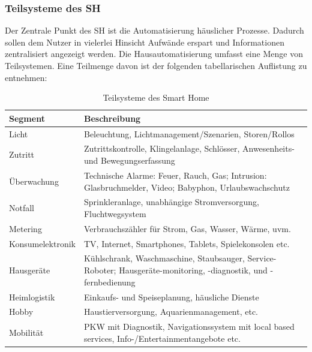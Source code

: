     \subsubsection*{Teilsysteme des \acl{SH}}
        Der Zentrale Punkt des \acl{SH} ist die Automatisierung häuslicher Prozesse. Dadurch sollen dem Nutzer 
        in vielerlei Hinsicht Aufwände erspart und Informationen zentralisiert angezeigt werden. Die Hausautomatisierung 
        umfasst eine Menge von Teilsystemen. Eine Teilmenge davon ist der folgenden tabellarischen Auflistung zu entnehmen: 
        \begin{table}[hbt!]
            \begin{center}
                \begin{tabular}{| p{3cm} | p{12.75cm} | }
                    \hline
                        \textbf{Segment} & \textbf{Beschreibung} \\
                    \hline
                        Licht & Beleuchtung, Lichtmanagement/Szenarien, Storen/Rollos \\ 
                    \hline
                        Zutritt & Zutrittskontrolle, Klingelanlage, Schlösser, Anwesenheits- und Bewegungserfassung \\ 
                    \hline
                        Überwachung & Technische Alarme: Feuer, Rauch, Gas; Intrusion: Glasbruchmelder, Video; Babyphon, Urlaubswachschutz \\ 
                    \hline
                        Notfall & Sprinkleranlage, unabhängige Stromversorgung, Fluchtwegsystem \\ 
                    \hline
                        Metering & Verbrauchszähler für Strom, Gas, Wasser, Wärme, uvm. \\ 
                    \hline 
                        Konsumelektronik & TV, Internet, Smartphones, Tablets, Spielekonsolen etc. \\
                    \hline
                        Hausgeräte & Kühlschrank, Waschmaschine, Staubsauger, Service-Roboter; Hausgeräte-monitoring, -diagnostik, und -fernbedienung \\
                    \hline
                        Heimlogistik & Einkaufs- und Speiseplanung, häusliche Dienste \\ 
                    \hline
                        Hobby & Haustierversorgung, Aquarienmanagement, etc. \\
                    \hline
                        Mobilität & PKW mit Diagnostik, Navigationssystem mit local based services, Info-/Entertainmentangebote etc. \\ 
                    \hline
                \end{tabular}
                \label{table:teilsysteme}
            \end{center}
            \caption{Teilsysteme des Smart Home \cite{strese.2010m}}
        \end{table}
